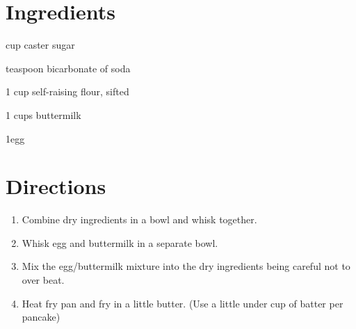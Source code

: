 

\section*{Ingredients}
\begin{ingredients-list}
	\item {} cup caster sugar
	\item {} teaspoon bicarbonate of soda
	\item 1 cup self-raising flour, sifted
	\item 1   cups buttermilk
	\item 1egg
\end{ingredients-list}

\section*{Directions}
\begin{enumerate}	
	\item Combine dry ingredients in a bowl and whisk together.
	\item Whisk egg and buttermilk in a separate bowl.
	\item Mix the egg/buttermilk mixture into the dry ingredients being careful not to over beat.
	\item Heat fry pan and fry in a little butter. (Use a little under  cup of batter per pancake)
\end{enumerate}
